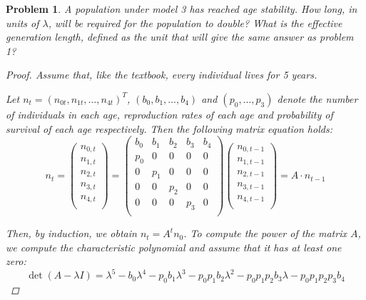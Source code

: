 \documentclass[12pt]{report}
\newtheorem{problem}{Problem}[chapter]
\begin{document}
\begin{problem}
    A population under model 3 has reached age stability. 
    How long, in units of $\lambda$, will be required for the population to double? 
    What is the effective generation length, defined as the unit that will give the same answer as problem 1?

    \begin{proof}
        Assume that, like the textbook, every individual lives for 5 years.

        Let $n_t = (n_{0t}, n_{1t}, \ldots, n_{4t})^T$, $(b_0, b_1, \ldots, b_4)$ and $(p_0, \ldots, p_3)$ denote the number of individuals in each age, reproduction rates of each age and probability of survival of each age respectively.
        Then the following matrix equation holds:
        \begin{equation*}
            n_t = 
            \begin{pmatrix}
                n_{0,t}\\
                n_{1,t}\\
                n_{2,t}\\
                n_{3,t}\\
                n_{4,t}\\
            \end{pmatrix} =  
            \begin{pmatrix}
                b_0 & b_1 & b_2 & b_3 & b_4 \\
                p_0 & 0 & 0 & 0 & 0\\
                0 & p_1 & 0 & 0 & 0\\
                0 & 0 & p_2 & 0 & 0\\
                0 & 0 & 0 & p_3 & 0\\
            \end{pmatrix}
            \begin{pmatrix}
                n_{0,t-1}\\
                n_{1,t-1}\\
                n_{2,t-1}\\
                n_{3,t-1}\\
                n_{4,t-1}\\
            \end{pmatrix} 
            = A \cdot n_{t-1}
        \end{equation*}

        Then, by induction, we obtain $n_t = A^{t}n_0$.
        To compute the power of the matrix $A$, we compute the characteristic polynomial and assume that it has at least one zero:
        \begin{equation*}
            \det{(A-\lambda I)} = \lambda^5 -b_0\lambda^4 -p_0b_1\lambda^3 - p_0p_1b_2\lambda^2 - p_0p_1p_2b_3\lambda - p_0p_1p_2p_3b_4 
        \end{equation*}
        

\end{proof}
\end{problem}
\end{document}
